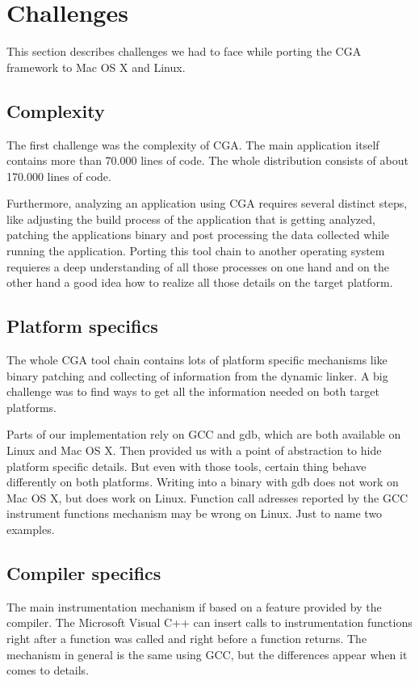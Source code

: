 \section{Challenges} This section describes challenges we had to face while porting the CGA framework to Mac OS X and Linux.

\subsection{Complexity} The first challenge was the complexity of CGA. The main application itself contains more than 70.000 lines of code. The whole distribution consists of about 170.000 lines of code. 

Furthermore, analyzing an application using CGA requires several distinct steps, like adjusting the build process of the application that is getting analyzed, patching the applications binary and post processing the data collected while running the application. Porting this tool chain to another operating system requieres a deep understanding of all those processes on one hand and on the other hand a good idea how to realize all those details on the target platform.

\subsection{Platform specifics} The whole CGA tool chain contains lots of platform specific mechanisms like binary patching and collecting of information from the dynamic linker. A big challenge was to find ways to get all the information needed on both target platforms. 

Parts of our implementation rely on GCC and gdb, which are both available on Linux and Mac OS X. Then provided us with a point of abstraction to hide platform specific details. But even with those tools, certain thing behave differently on both platforms. Writing into a binary with gdb does not work on Mac OS X, but does work on Linux. Function call adresses reported by the GCC instrument functions mechanism may be wrong on Linux. Just to name two examples. 

\subsection{Compiler specifics} The main instrumentation mechanism if based on a feature provided by the compiler. The Microsoft Visual C++ can insert calls to instrumentation functions right after a function was called and right before a function returns. The mechanism in general is the same using GCC, but the differences appear when it comes to details. 

